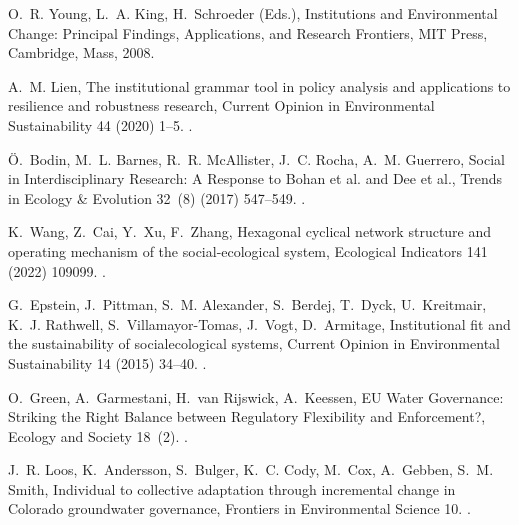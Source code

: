 \documentclass[preprint, 12pt]{elsarticle}
\begin{document}
\begin{thebibliography}{10}
O.~R. Young, L.~A. King, H.~Schroeder (Eds.), Institutions and Environmental
  Change: Principal Findings, Applications, and Research Frontiers, {MIT
  Press}, {Cambridge, Mass}, 2008.

A.~M. Lien, The institutional grammar tool in policy analysis and applications
  to resilience and robustness research, Current Opinion in Environmental
  Sustainability 44 (2020) 1--5.
\newblock \href {http://dx.doi.org/10.1016/j.cosust.2020.02.004}
  {}.

{\"O}.~Bodin, M.~L. Barnes, R.~R. McAllister, J.~C. Rocha, A.~M. Guerrero,
  Social in {{Interdisciplinary
  Research}}: {{A Response}} to {{Bohan}} et al. and {{Dee}} et al., Trends in
  Ecology \& Evolution 32~(8) (2017) 547--549.
\newblock \href {http://dx.doi.org/10.1016/j.tree.2017.06.003}
  {}.

K.~Wang, Z.~Cai, Y.~Xu, F.~Zhang, Hexagonal cyclical network structure and
  operating mechanism of the social-ecological system, Ecological Indicators
  141 (2022) 109099.
\newblock \href {http://dx.doi.org/10.1016/j.ecolind.2022.109099}
  {}.

G.~Epstein, J.~Pittman, S.~M. Alexander, S.~Berdej, T.~Dyck, U.~Kreitmair,
  K.~J. Rathwell, S.~{Villamayor-Tomas}, J.~Vogt, D.~Armitage, Institutional
  fit and the sustainability of social\textendash ecological systems, Current
  Opinion in Environmental Sustainability 14 (2015) 34--40.
\newblock \href {http://dx.doi.org/10.1016/j.cosust.2015.03.005}
  {}.

O.~Green, A.~Garmestani, H.~{van Rijswick}, A.~Keessen, {{EU Water
  Governance}}: {{Striking}} the {{Right Balance}} between {{Regulatory
  Flexibility}} and {{Enforcement}}?, Ecology and Society 18~(2).
\newblock \href {http://dx.doi.org/10.5751/ES-05357-180210}
  {}.

J.~R. Loos, K.~Andersson, S.~Bulger, K.~C. Cody, M.~Cox, A.~Gebben, S.~M.
  Smith, Individual to collective adaptation through incremental change in
  {{Colorado}} groundwater governance, Frontiers in Environmental Science 10.
\newblock \href {http://dx.doi.org/10.3389/fenvs.2022.958597}
  {}.


\end{thebibliography}
\end{document}
